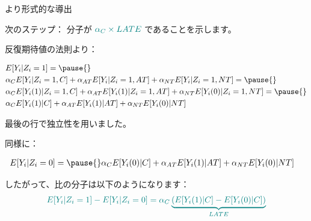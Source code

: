 \documentclass[11pt,handout]{beamer}
\newenvironment{wideitemize}{\itemize\addtolength{\itemsep}{10pt}}{\enditemize}
\begin{document}
\begin{frame}{より形式的な導出}

\begin{wideitemize}
	
	\item
	次のステップ：{\color{teal} 分子}が $\color{teal} \alpha_C \times LATE$ であることを示します。
	
	\pause
	
	\item 
	反復期待値の法則より：
	\begin{small}
	\begin{align*}
	 &E[Y_i | Z_i = 1]  = \pause{}\\ %
	&\alpha_C E[ Y_i | Z_i = 1, C ] +  \alpha_{AT} E[ Y_i | Z_i = 1, AT ] + \alpha_{NT}E[Y_i | Z_i  =1, NT] =\pause{}\\%
	& \alpha_C E[ Y_i(1) | Z_i = 1, C ] +  \alpha_{AT} E[ Y_i(1) | Z_i = 1, AT ] + \alpha_{NT}E[Y_i(0) | Z_i  =1, NT] = \pause{}\\
	& \alpha_C E[ Y_i(1) | C ] +  \alpha_{AT} E[ Y_i(1) | AT ] + \alpha_{NT}E[Y_i(0) |  NT]
	\end{align*} 
	\end{small}	
	\noindent 最後の行で独立性を用いました。
	\item
	同様に：
		\begin{small}
		\begin{align*}
			&E[Y_i | Z_i = 0]  = \pause{} \alpha_C E[ Y_i(0) | C ] +  \alpha_{AT} E[ Y_i(1) | AT ] + \alpha_{NT}E[Y_i(0) |  NT] %
		\end{align*} 
	\end{small}	

	\item
	したがって、比の分子は以下のようになります：
	$$ \color{teal} E[Y_i | Z_i = 1] - E[Y_i | Z_i = 0]  = \alpha_C \underbrace{(E[Y_i(1) | C]  - E[Y_i(0) | C])}_{LATE}$$  
\end{wideitemize}	
	
\end{frame}
\end{document}
